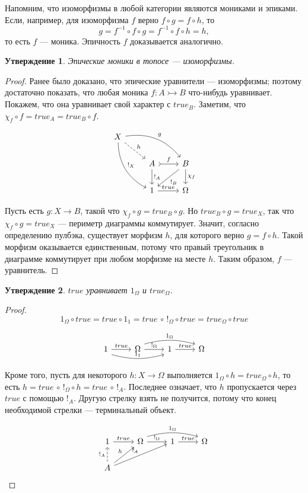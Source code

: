 \documentclass[a4paper, 12pt]{article}
\newtheorem{exercise}{Утверждение}
\begin{document}
Напомним, что изоморфизмы в любой категории являются мониками и эпиками. Если, например, для изоморфизма $f$ верно $f\circ g = f\circ h$, то 
$$g = f^{-1}\circ f\circ g = f^{-1}\circ f\circ h = h,$$ 
то есть $f$ --- моника. Эпичность $f$ доказывается аналогично. 
\begin{exercise}
Эпические моники в топосе --- изоморфизмы.
\end{exercise}
\begin{proof}
Ранее было доказано, что эпические уравнители --- изоморфизмы; поэтому достаточно показать, что любая моника $f\colon A\rightarrowtail B$ что-нибудь уравнивает. Покажем, что она уравнивает свой характер с $true_B$. Заметим, что $\chi_f\circ f = true_A = true_B\circ f$.

\[
\begin{tikzcd}
X
\arrow[bend left]{drr}{g}
\arrow[bend right]{ddr}{!_X}
\arrow[dashrightarrow]{dr}{h}
& & \\
& A \arrow{d}{!_A} \arrow[tail]{r}{f}
& B \arrow{d}{\chi_f} \arrow{ld}{!_B} \\
& 1 \arrow{r}{true}
& \Omega
\end{tikzcd}
\]

Пусть есть $g\colon X\to B$, такой что $\chi_f\circ g = true_B\circ g$. Но $true_B \circ g = true_X$, так что $\chi_f\circ g = true_X$ --- периметр диаграммы коммутирует. Значит, согласно определению пулбэка, существует морфизм $h$, для которого верно $g=f\circ h$. Такой морфизм оказывается единственным, потому что правый треугольник в диаграмме коммутирует при любом морфизме на месте $h$. Таким образом, $f$ --- уравнитель.\end{proof}

\begin{exercise}
$true$ уравнивает $1_\Omega$ и $true_\Omega$.
\end{exercise}
\begin{proof}
$$1_\Omega\circ true = true \circ 1_1 = true\,\circ\, !_\Omega\circ true = true_\Omega\circ true$$

\[
\begin{tikzcd}
1 \arrow[shift right=1ex, bend right=15]{rr}{1_1} \arrow{r}{true} 
& \Omega \arrow[shift left=1ex, bend left=15]{rr}{1_\Omega} \arrow{r}{!_\Omega} & 1
\arrow{r}{true} & \Omega
\end{tikzcd}
\]

Кроме того, пусть для некоторого $h\colon X\to \Omega$ выполняется $1_\Omega\circ h = true_\Omega\circ h$, то есть $h=true\,\circ\, !_\Omega\circ h = true\,\circ\,!_A$. Последнее означает, что $h$ пропускается через $true$ с помощью $!_A$. Другую стрелку взять не получится, потому что конец необходимой стрелки --- терминальный объект.

\[
\begin{tikzcd}
1  \arrow{r}{true} 
& \Omega \arrow[shift left=1ex, bend left=15]{rr}{1_\Omega} \arrow{r}{!_\Omega} & 1
\arrow{r}{true} & \Omega \\
A \arrow[dashrightarrow]{u}{!_A}
\arrow{ur}{h}
\arrow{urr}{!_A}
\end{tikzcd}
\]

\end{proof}
\end{document}
